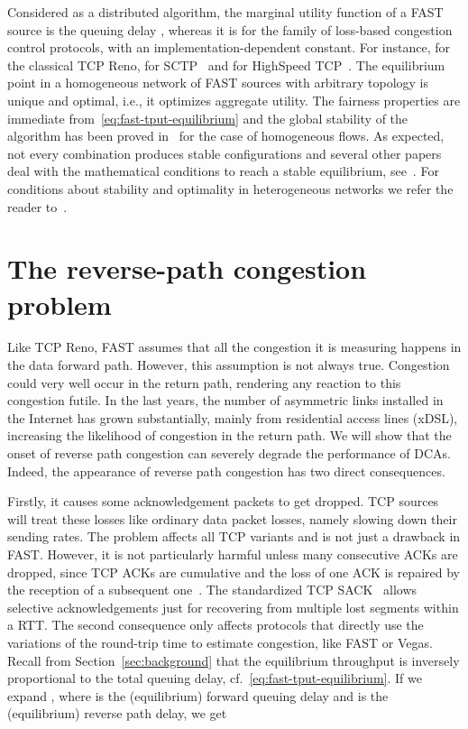 \documentclass[english,times]{ettauth}
\begin{document}
Considered as a distributed algorithm, the marginal utility function of a FAST
source is the queuing delay , whereas it is  for the family of loss-based congestion control protocols,
with  an implementation-dependent constant. For instance,  for the classical TCP Reno,  for SCTP~\cite{Kelly03} and  for HighSpeed TCP~\cite{Floyd03}. The equilibrium point in a
homogeneous network of FAST sources with arbitrary topology is unique and
optimal, i.e., it optimizes aggregate utility. The fairness properties are
immediate from~\eqref{eq:fast-tput-equilibrium} and the global stability of
the algorithm has been proved in~\cite{Choi06} for the case of homogeneous
flows. As expected, not every  combination produces stable
configurations and several other papers deal with the mathematical conditions
to reach a stable equilibrium, see~\cite{Wang05,Choi05,Tan07}. For conditions
about stability and optimality in heterogeneous networks we refer the reader
to~\cite{Tang10}.

\section{The reverse-path congestion problem}
\label{sec:reverse-path-cong}

Like TCP Reno, FAST assumes that all the congestion it is measuring happens in
the data forward path. However, this assumption is not always true. Congestion
could very well occur in the return path, rendering any reaction to this
congestion futile. In the last years, the number of asymmetric links installed
in the Internet has grown substantially, mainly from residential access lines
(xDSL), increasing the likelihood of congestion in the return path. We will
show that the onset of reverse path congestion can severely degrade the
performance of DCAs. Indeed, the appearance of reverse path congestion has two
direct consequences.

Firstly, it causes some acknowledgement packets to get dropped. TCP sources
will treat these losses like ordinary data packet losses, namely slowing down
their sending rates. The problem affects all TCP variants and is not just a
drawback in FAST. However, it is not particularly harmful unless many
consecutive ACKs are dropped, since TCP ACKs are cumulative and the loss of
one ACK is repaired by the reception of a subsequent one~\cite{Fu03}. The
standardized TCP SACK~\cite{rfc2018} allows selective acknowledgements just
for recovering from multiple lost segments within a RTT. The second
consequence only affects protocols that directly use the variations of the
round-trip time to estimate congestion, like FAST or Vegas. Recall from
Section~\ref{sec:background} that the equilibrium throughput is inversely
proportional to the total queuing delay, cf.~\eqref{eq:fast-tput-equilibrium}.
If we expand ,
where  is the (equilibrium) forward queuing delay and
 is the (equilibrium) reverse path delay, we get
\end{document}
